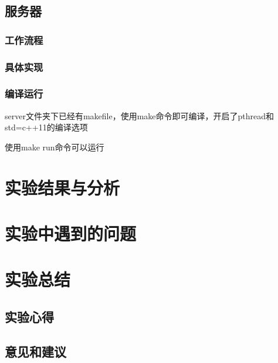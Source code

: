 \documentclass[paper=a4, fontsize=11pt, UTF8]{article} %
\begin{document}
\subsection{服务器}
\subsubsection{工作流程}
\subsubsection{具体实现}
\subsubsection{编译运行}
server文件夹下已经有makefile，使用make命令即可编译，开启了pthread和std=c++11的编译选项

使用make run命令可以运行

\section{实验结果与分析}

\section{实验中遇到的问题}


\section{实验总结}
\subsection{实验心得}
\subsection{意见和建议}
\end{document}
